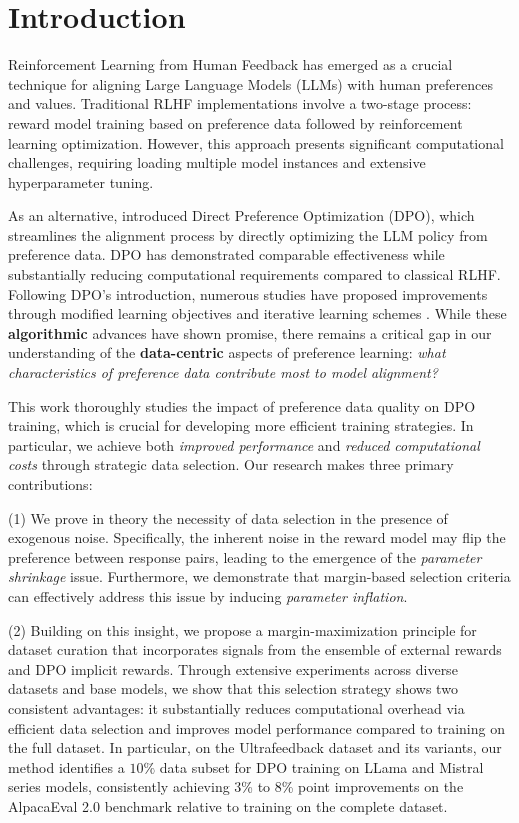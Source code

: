 \section{Introduction}
\label{sec:intro}

Reinforcement Learning from Human Feedback \citep[RLHF;][]{christiano2017deep,ziegler2019fine} has emerged as a crucial technique for aligning Large Language Models (LLMs) with human preferences and values. Traditional RLHF implementations involve a two-stage process: reward model training based on preference data followed by reinforcement learning optimization. However, this approach presents significant computational challenges, requiring loading multiple model instances and extensive hyperparameter tuning.



As an alternative, \citet{rafailov2024direct} introduced Direct Preference Optimization (DPO), which streamlines the alignment process by directly optimizing the LLM policy from preference data. DPO has demonstrated comparable effectiveness while substantially reducing computational requirements compared to classical RLHF. Following DPO's introduction, numerous studies have proposed improvements through modified learning objectives \citep{zhao2023slic,azar2024general,ethayarajh2024kto}
and iterative learning schemes \citep{xiong2024iterative}. 
While these \textbf{algorithmic} advances have shown promise, there remains a critical gap in our understanding of the \textbf{data-centric} aspects of preference learning: \emph{what characteristics of preference data contribute most to model alignment?}


This work thoroughly studies the impact of preference data quality on DPO training, which is crucial for developing more efficient training strategies. In particular, we achieve both \emph{improved performance} and \emph{reduced computational costs} through strategic data selection. Our research makes three primary contributions:

(1) We prove in theory the necessity of data selection in the presence of exogenous noise. Specifically, the inherent noise in the reward model may flip the preference between response pairs, leading to the emergence of the \emph{parameter shrinkage} issue. Furthermore, we demonstrate that margin-based selection criteria can effectively address this issue by inducing \emph{parameter inflation}.


(2) Building on this insight, we propose a margin-maximization principle for dataset curation that incorporates signals from the ensemble of external rewards and DPO implicit rewards. Through extensive experiments across diverse datasets and base models, we show that this selection strategy shows two consistent advantages: it substantially reduces computational overhead via efficient data selection and improves model performance compared to training on the full dataset. In particular, on the Ultrafeedback dataset and its variants, our method identifies a $10\%$ data subset for DPO training on LLama and Mistral series models, consistently achieving 3\% to 8\% point improvements on the AlpacaEval 2.0 benchmark relative to training on the complete dataset.
    
